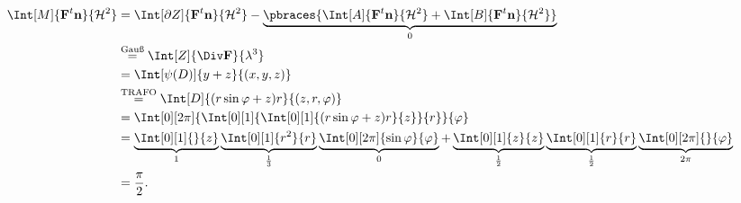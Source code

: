 \begin{solution}
\begin{enumerate}
    \begin{align*}
        \Int[M]
        {
            \mathbf F^t \mathbf n
        }{
            \mathcal H^2
        }
        & =
        \Int[\partial Z]
        {
            \mathbf F^t \mathbf n
        }{
            \mathcal H^2
        }
        -
        \underbrace
        {
            \pbraces
            {
                \Int[A]
                {
                    \mathbf F^t \mathbf n
                }{
                    \mathcal H^2
                }
                +
                \Int[B]
                {
                    \mathbf F^t \mathbf n
                }{
                    \mathcal H^2
                }
            }
        }_0 \\
        & \stackrel
        {
            \text{Gauß}
        }{=}
        \Int[Z]
        {
            \Div \mathbf F
        }{
            \lambda^3
        } \\
        & =
        \Int[\psi(D)]
        {
            y + z
        }{(x, y, z)} \\
        & \stackrel
        {
            \text{TRAFO}
        }{=}
        \Int[D]
        {
            (r \sin \varphi + z) r
        }{(z, r, \varphi)} \\
        & =
        \Int[0][2 \pi]
        {
            \Int[0][1]
            {
                \Int[0][1]
                {
                    (r \sin \varphi + z) r
                }{z}
            }{r}
        }{\varphi} \\
        & =
        \underbrace
        {
            \Int[0][1]{}{z}
        }_1
        \underbrace
        {
            \Int[0][1]{r^2}{r}
        }_\frac{1}{3}
        \underbrace
        {
            \Int[0][2 \pi]
            {
                \sin \varphi
            }{\varphi}
        }_0
        +
        \underbrace
        {
            \Int[0][1]{z}{z}
        }_\frac{1}{2}
        \underbrace
        {
            \Int[0][1]{r}{r}
        }_\frac{1}{2}
        \underbrace
        {
            \Int[0][2 \pi]{}{\varphi}
        }_{2 \pi} \\
        & =
        \frac{\pi}{2}.
    \end{align*}

\end{enumerate}

\end{solution}

